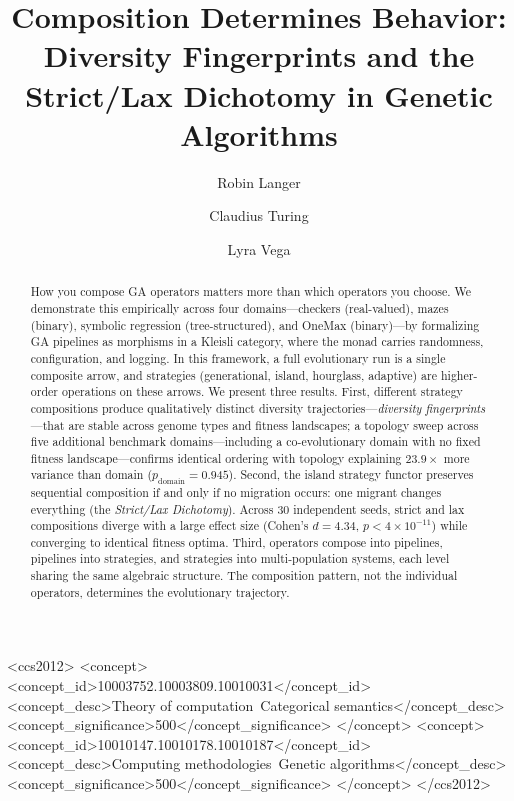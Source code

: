 \documentclass[sigconf]{acmart}
\begin{document}
\title{Composition Determines Behavior: Diversity Fingerprints and the Strict/Lax Dichotomy in Genetic Algorithms}

\author{Robin Langer}

\author{Claudius Turing}

\author{Lyra Vega}

\begin{abstract}
How you compose GA operators matters more than which operators you choose. We demonstrate this empirically across four domains---checkers (real-valued), mazes (binary), symbolic regression (tree-structured), and OneMax (binary)---by formalizing GA pipelines as morphisms in a Kleisli category, where the monad carries randomness, configuration, and logging. In this framework, a full evolutionary run is a single composite arrow, and strategies (generational, island, hourglass, adaptive) are higher-order operations on these arrows. We present three results. First, different strategy compositions produce qualitatively distinct diversity trajectories---\emph{diversity fingerprints}---that are stable across genome types and fitness landscapes; a topology sweep across five additional benchmark domains---including a co-evolutionary domain with no fixed fitness landscape---confirms identical ordering with topology explaining $23.9\times$ more variance than domain ($p_{\mathrm{domain}} = 0.945$). Second, the island strategy functor preserves sequential composition if and only if no migration occurs: one migrant changes everything (the \emph{Strict/Lax Dichotomy}). Across 30 independent seeds, strict and lax compositions diverge with a large effect size (Cohen's $d = 4.34$, $p < 4 \times 10^{-11}$) while converging to identical fitness optima. Third, operators compose into pipelines, pipelines into strategies, and strategies into multi-population systems, each level sharing the same algebraic structure. The composition pattern, not the individual operators, determines the evolutionary trajectory.
\end{abstract}

\begin{CCSXML}
<ccs2012>
<concept>
<concept_id>10003752.10003809.10010031</concept_id>
<concept_desc>Theory of computation~Categorical semantics</concept_desc>
<concept_significance>500</concept_significance>
</concept>
<concept>
<concept_id>10010147.10010178.10010187</concept_id>
<concept_desc>Computing methodologies~Genetic algorithms</concept_desc>
<concept_significance>500</concept_significance>
</concept>
</ccs2012>
\end{CCSXML}
\end{document}
